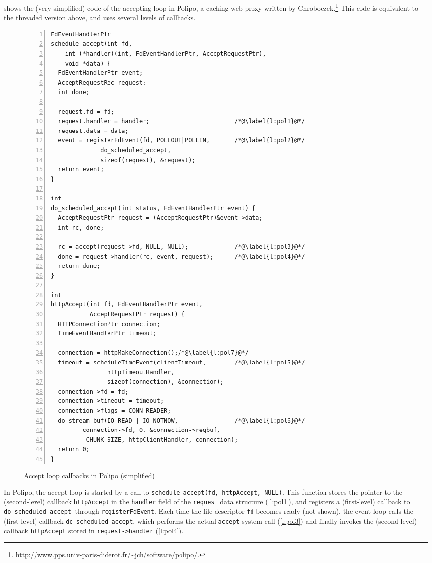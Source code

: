 \documentclass[a4paper]{llncs}
\begin{document}
 shows the (very simplified) code of the accepting loop in
Polipo, a caching web-proxy written by
Chroboczek.\footnote{\url{http://www.pps.univ-paris-diderot.fr/~jch/software/polipo/}.}
This code is equivalent to the threaded version above, and uses several levels
of callbacks.

\begin{figure}[tbp]
\begin{spacing}{0.8}
\begin{lstlisting}[numbers=left,xleftmargin=0pt]
FdEventHandlerPtr
schedule_accept(int fd,
    int (*handler)(int, FdEventHandlerPtr, AcceptRequestPtr),
    void *data) {
  FdEventHandlerPtr event;
  AcceptRequestRec request;
  int done;

  request.fd = fd;
  request.handler = handler;                        /*@\label{l:pol1}@*/
  request.data = data;
  event = registerFdEvent(fd, POLLOUT|POLLIN,       /*@\label{l:pol2}@*/
              do_scheduled_accept,
              sizeof(request), &request);
  return event;
}

int
do_scheduled_accept(int status, FdEventHandlerPtr event) {
  AcceptRequestPtr request = (AcceptRequestPtr)&event->data;
  int rc, done;

  rc = accept(request->fd, NULL, NULL);             /*@\label{l:pol3}@*/
  done = request->handler(rc, event, request);      /*@\label{l:pol4}@*/
  return done;
}

int
httpAccept(int fd, FdEventHandlerPtr event,
           AcceptRequestPtr request) {
  HTTPConnectionPtr connection;
  TimeEventHandlerPtr timeout;

  connection = httpMakeConnection();/*@\label{l:pol7}@*/
  timeout = scheduleTimeEvent(clientTimeout,        /*@\label{l:pol5}@*/
                httpTimeoutHandler,
                sizeof(connection), &connection);
  connection->fd = fd;
  connection->timeout = timeout;
  connection->flags = CONN_READER;
  do_stream_buf(IO_READ | IO_NOTNOW,                /*@\label{l:pol6}@*/
         connection->fd, 0, &connection->reqbuf,
          CHUNK_SIZE, httpClientHandler, connection);
  return 0;
}
\end{lstlisting}
\end{spacing}
\caption{Accept loop callbacks in Polipo (simplified)}
\label{fig:polipo}
\end{figure}

In Polipo, the accept loop is started by a call to
\texttt{schedule\_\-accept(fd, http\-Accept, NULL)}.
This function stores the pointer to the (second-level) callback
\texttt{httpAccept} in the \texttt{handler} field of the \texttt{request} data
structure (\cref{l:pol1}), and registers a (first-level) callback to
\texttt{do\_scheduled\_accept}, through
\texttt{regi\-ster\-Fd\-Event}.  Each time the file descriptor \texttt{fd}
becomes ready (not shown), the event loop calls the (first-level) callback
\texttt{do\_scheduled\_accept}, which performs the actual \texttt{accept} system
call (\cref{l:pol3}) and finally invokes the (second-level) callback \texttt{httpAccept}
stored in \texttt{request->handler} (\cref{l:pol4}).
\end{document}
